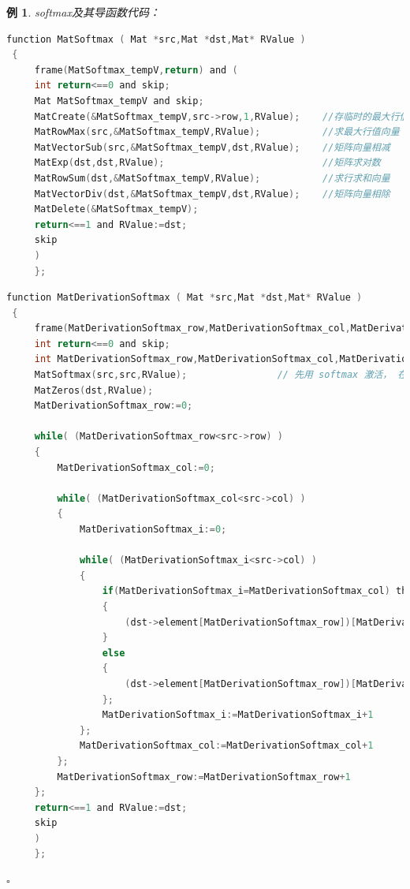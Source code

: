 \documentclass[UTF-8]{progbookcn}
\newtheorem{example}{例}[chapter]         %
\begin{document}
\begin{example}
{\setsansfont{Myriad Pro}softmax}及其导函数代码：
  \begin{lstlisting}[language=C,caption={函数 5 MatSoftmax}]
function MatSoftmax ( Mat *src,Mat *dst,Mat* RValue )
 {
     frame(MatSoftmax_tempV,return) and (
     int return<==0 and skip;
     Mat MatSoftmax_tempV and skip;
     MatCreate(&MatSoftmax_tempV,src->row,1,RValue);    //存临时的最大行值以及求和行值向量
     MatRowMax(src,&MatSoftmax_tempV,RValue);           //求最大行值向量
     MatVectorSub(src,&MatSoftmax_tempV,dst,RValue);    //矩阵向量相减
     MatExp(dst,dst,RValue);                            //矩阵求对数
     MatRowSum(dst,&MatSoftmax_tempV,RValue);           //求行求和向量
     MatVectorDiv(dst,&MatSoftmax_tempV,dst,RValue);    //矩阵向量相除
     MatDelete(&MatSoftmax_tempV);
     return<==1 and RValue:=dst;
     skip
     )
     };
\end{lstlisting}

\begin{lstlisting}[language=C,caption={函数 11 MatDerivationSoftmax}]
function MatDerivationSoftmax ( Mat *src,Mat *dst,Mat* RValue )
 {
     frame(MatDerivationSoftmax_row,MatDerivationSoftmax_col,MatDerivationSoftmax_i,return) and (
     int return<==0 and skip;
     int MatDerivationSoftmax_row,MatDerivationSoftmax_col,MatDerivationSoftmax_i and skip;
     MatSoftmax(src,src,RValue);                // 先用 softmax 激活， 在根据公式判断选择。
     MatZeros(dst,RValue);
     MatDerivationSoftmax_row:=0;

     while( (MatDerivationSoftmax_row<src->row) )
     {
         MatDerivationSoftmax_col:=0;

         while( (MatDerivationSoftmax_col<src->col) )
         {
             MatDerivationSoftmax_i:=0;

             while( (MatDerivationSoftmax_i<src->col) )
             {
                 if(MatDerivationSoftmax_i=MatDerivationSoftmax_col) then       // 选择一
                 {
                     (dst->element[MatDerivationSoftmax_row])[MatDerivationSoftmax_col]:=(dst->element[MatDerivationSoftmax_row])[MatDerivationSoftmax_col]+(src->element[MatDerivationSoftmax_row])[MatDerivationSoftmax_i]*(1-(src->element[MatDerivationSoftmax_row])[MatDerivationSoftmax_col])
                 }
                 else                                                           // 选择二
                 {
                     (dst->element[MatDerivationSoftmax_row])[MatDerivationSoftmax_col]:=(dst->element[MatDerivationSoftmax_row])[MatDerivationSoftmax_col]+-(src->element[MatDerivationSoftmax_row])[MatDerivationSoftmax_i]*(src->element[MatDerivationSoftmax_row])[MatDerivationSoftmax_col]
                 };
                 MatDerivationSoftmax_i:=MatDerivationSoftmax_i+1
             };
             MatDerivationSoftmax_col:=MatDerivationSoftmax_col+1
         };
         MatDerivationSoftmax_row:=MatDerivationSoftmax_row+1
     };
     return<==1 and RValue:=dst;
     skip
     )
     };
\end{lstlisting} \hfill$\square$
\end{example}
\end{document}
